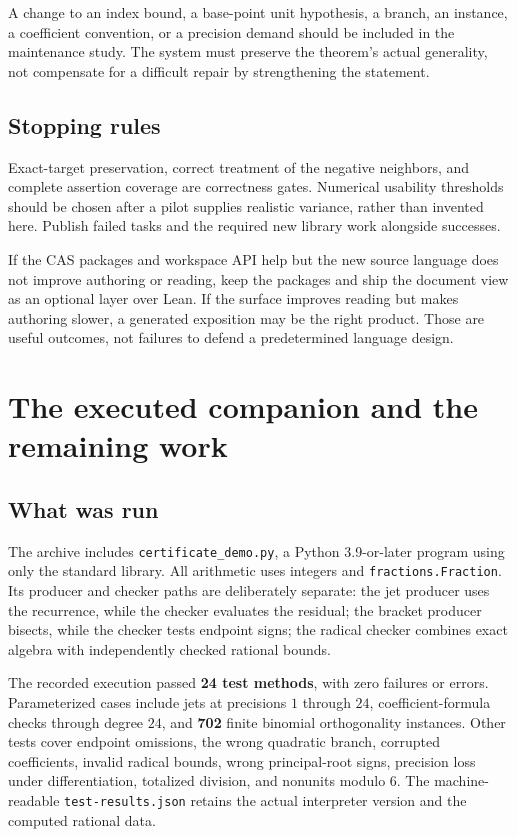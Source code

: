 \documentclass[11pt,letterpaper]{article}
\newcommand{\code}[1]{\nolinkurl{#1}}
\theoremstyle{definition}
\theoremstyle{remark}
\begin{document}
A change to an index bound, a base-point unit hypothesis, a branch, an instance,
a coefficient convention, or a precision demand should be included in the
maintenance study. The system must preserve the theorem's actual generality,
not compensate for a difficult repair by strengthening the statement.

\subsection{Stopping rules}
Exact-target preservation, correct treatment of the negative neighbors, and
complete assertion coverage are correctness gates. Numerical usability thresholds
should be chosen after a pilot supplies realistic variance, rather than invented
here. Publish failed tasks and the required new library work alongside successes.

If the CAS packages and workspace API help but the new source language does
not improve authoring or reading, keep the packages and ship the document view
as an optional layer over Lean. If the surface improves reading but makes
authoring slower, a generated exposition may be the right product. Those are
useful outcomes, not failures to defend a predetermined language design.

\section{The executed companion and the remaining work}
\label{sec:demo}

\subsection{What was run}
The archive includes \code{certificate_demo.py}, a Python 3.9-or-later program
using only the standard library. All arithmetic uses integers and
\code{fractions.Fraction}. Its producer and checker paths are deliberately
separate: the jet producer uses the recurrence, while the checker evaluates
the residual; the bracket producer bisects, while the checker tests endpoint
signs; the radical checker combines exact algebra with independently checked
rational bounds.

The recorded execution passed \textbf{24 test methods}, with zero failures or
errors. Parameterized cases include jets at precisions $1$ through $24$,
coefficient-formula checks through degree $24$, and \textbf{702} finite binomial
orthogonality instances. Other tests cover endpoint omissions, the wrong
quadratic branch, corrupted coefficients, invalid radical bounds, wrong
principal-root signs, precision loss under differentiation, totalized division,
and nonunits modulo $6$. The machine-readable \code{test-results.json} retains
the actual interpreter version and the computed rational data.
\end{document}
